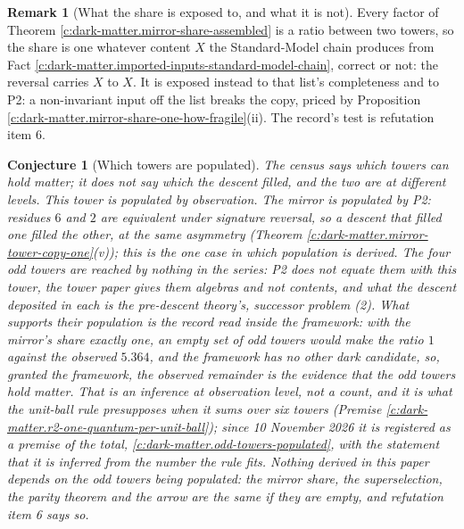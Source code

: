 \documentclass[11pt]{article}
\newtheorem{conjecture}[theorem]{Conjecture}
\theoremstyle{definition}
\newtheorem{remark}[theorem]{Remark}
\theoremstyle{plain}
\newcommand{\changedmark}[2]{\marginpar{\raggedright\scriptsize\color{#1}#2}}
\begin{document}
\begin{remark}[What the share is exposed to, and what it is not]\label{c:note.dark-matter.what-share-exposed-what-it-not}
Every factor of Theorem \ref{c:dark-matter.mirror-share-assembled} is a ratio between two towers, so the share is one whatever content $X$ the Standard-Model chain produces from Fact \ref{c:dark-matter.imported-inputs-standard-model-chain}, correct or not: the reversal carries $X$ to $X$. It is exposed instead to that list's completeness and to P2: a non-invariant input off the list breaks the copy, priced by Proposition \ref{c:dark-matter.mirror-share-one-how-fragile}(ii). The record's test is refutation item 6.
\end{remark}

\begin{conjecture}[Which towers are populated]\label{c:dark-matter.which-towers-are-populated}
\changedmark{BurntOrange}{changed since the deposit}
The census says which towers can hold matter; it does not say which the descent filled, and the two are at different levels. This tower is populated by observation. The mirror is populated by P2: residues $6$ and $2$ are equivalent under signature reversal, so a descent that filled one filled the other, at the same asymmetry (Theorem \ref{c:dark-matter.mirror-tower-copy-one}(v)); this is the one case in which population is derived. The four odd towers are reached by nothing in the series: P2 does not equate them with this tower, the tower paper gives them algebras and not contents, and what the descent deposited in each is the pre-descent theory's, successor problem (2). What supports their population is the record read inside the framework: with the mirror's share exactly one, an empty set of odd towers would make the ratio $1$ against the observed $5.364$, and the framework has no other dark candidate, so, granted the framework, the observed remainder is the evidence that the odd towers hold matter. That is an inference at observation level, not a count, and it is what the unit-ball rule presupposes when it sums over six towers (Premise \ref{c:dark-matter.r2-one-quantum-per-unit-ball}); since 10 November 2026 it is registered as a premise of the total, \ref{c:dark-matter.odd-towers-populated}, with the statement that it is inferred from the number the rule fits. Nothing derived in this paper depends on the odd towers being populated: the mirror share, the superselection, the parity theorem and the arrow are the same if they are empty, and refutation item 6 says so.
\end{conjecture}
\end{document}
